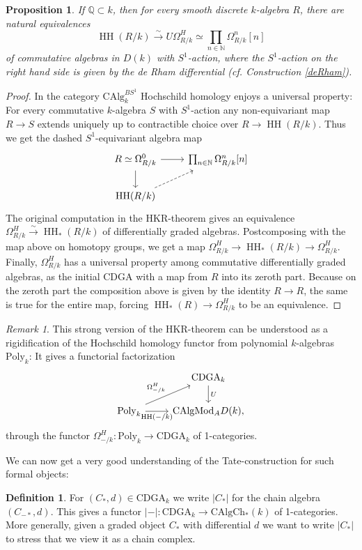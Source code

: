 \documentclass[10pt, reqno]{amsart}
\newtheorem{proposition}[theorem]{Proposition}
\theoremstyle{definition}
\newtheorem{definition}[theorem]{Definition}
\theoremstyle{remark}
\newtheorem{remark}[theorem]{Remark}
\newcommand{\Q}{\mathbb{Q}}
\newcommand{\N}{\mathbb{N}}
\newcommand{\CAlg}{\mathrm{CAlg}}
\newcommand{\dr}[3]{\Omega^{#3}_{#1/#2}}
\newcommand{\Ch}{\mathrm{Ch}}
\newcommand{\Poly}{\mathrm{Poly}}
\newcommand{\Mod}{\mathrm{Mod}}
\newcommand{\CDGA}{\mathrm{CDGA}}
\DeclareMathOperator{\HH}{\mathrm{HH}}
\begin{document}
\begin{proposition}\label{HKR}
	If $\Q\subset k$, then for every smooth discrete $k$-algebra $R$, there are natural equivalences
	\[\HH(R/k)\xrightarrow{\sim}U\dr RkH\simeq\prod_{n\in\N}\dr Rkn[n]\]
	of commutative algebras in $D(k)$ with $S^1$-action, where the $S^1$-action on the right hand side is given by the de Rham differential (cf. Construction \ref{deRham}).
\end{proposition}
\begin{proof}
	In the category $\CAlg_k^{BS^1}$ Hochschild homology enjoys a universal property: For every commutative $k$-algebra $S$ with $S^1$-action any non-equivariant map $R\to S$ extends uniquely up to contractible choice over $R\to\HH(R/k)$. Thus we get the dashed $S^1$-equivariant algebra map
	\[\begin{tikzcd}
	R\simeq\dr Rk0\ar[r]\ar[d]&\prod_{n\in\N}\dr Rkn[n]\\
	\HH(R/k)\ar[ru, dashed]
	\end{tikzcd}\]
	 The original computation in the HKR-theorem \cite{HKR62} gives an equivalence $\dr RkH\xrightarrow{\sim}\HH_*(R/k)$ of differentially graded algebras. Postcomposing with the map above on homotopy groups, we get a map $\dr RkH\to\HH_*(R/k)\to\dr RkH$. Finally, $\dr RkH$ has a universal property among commutative differentially graded algebras, as the initial CDGA with a map from $R$ into its zeroth part. Because on the zeroth part the composition above is given by the identity $R\to R$, the same is true for the entire map, forcing $\HH_*(R)\to\dr RkH$ to be an equivalence.
\end{proof}


\begin{remark}
	This strong version of the HKR-theorem can be understood as a rigidification of the Hochschild homology functor from polynomial $k$-algebras $\Poly_k$: It gives a functorial factorization 
	\[\begin{tikzcd}
	& \CDGA_k\ar[d,"U"]\\
	\Poly_k\ar[ru, "\dr -kH"]\ar[r,swap, "\HH(-/k)"]&\CAlg\Mod_{A} D(k),
	\end{tikzcd}
	\]
	through the functor $\dr -kH\colon\Poly_k\to\CDGA_k$ of 1-categories.
\end{remark}

We can now get a very good understanding of the Tate-construction for such formal objects:

\begin{definition}
	For $(C_*,d)\in\CDGA_k$ we write $|C_*|$ for the chain algebra $(C_{-*},d)$. This gives a functor $|-|\colon\CDGA_k\to\CAlg\Ch_*(k)$ of 1-categories. More generally, given a graded object $C_*$ with differential $d$ we want to write $|C_*|$ to stress that we view it as a chain complex.
\end{definition}
\end{document}
